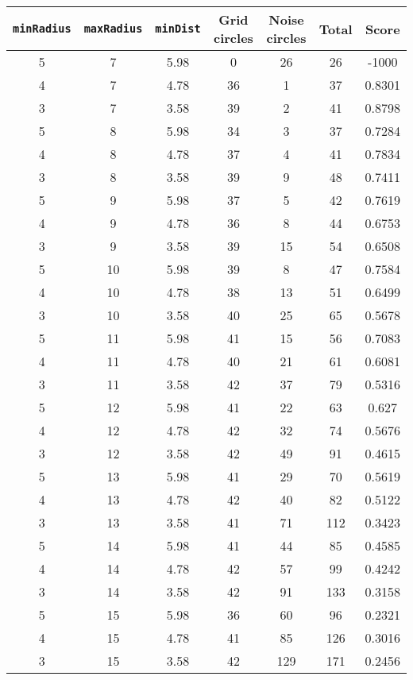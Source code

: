 \documentclass[letterpaper, 12pt]{article}
\begin{document}
\begin{longtable}{|c|c|c|c|c|c|c|}
\hline
\textbf{\texttt{minRadius}} & \textbf{\texttt{maxRadius}} & \textbf{\texttt{minDist}} & \textbf{Grid circles} & \textbf{Noise circles} & \textbf{Total} & \textbf{Score} \\
\hline
5 & 7 & 5.98 & 0 & 26 & 26 & -1000 \\
\hline
4 & 7 & 4.78 & 36 & 1 & 37 & 0.8301 \\
\hline
3 & 7 & 3.58 & 39 & 2 & 41 & 0.8798 \\
\hline
5 & 8 & 5.98 & 34 & 3 & 37 & 0.7284 \\
\hline
4 & 8 & 4.78 & 37 & 4 & 41 & 0.7834 \\
\hline
3 & 8 & 3.58 & 39 & 9 & 48 & 0.7411 \\
\hline
5 & 9 & 5.98 & 37 & 5 & 42 & 0.7619 \\
\hline
4 & 9 & 4.78 & 36 & 8 & 44 & 0.6753 \\
\hline
3 & 9 & 3.58 & 39 & 15 & 54 & 0.6508 \\
\hline
5 & 10 & 5.98 & 39 & 8 & 47 & 0.7584 \\
\hline
4 & 10 & 4.78 & 38 & 13 & 51 & 0.6499 \\
\hline
3 & 10 & 3.58 & 40 & 25 & 65 & 0.5678 \\
\hline
5 & 11 & 5.98 & 41 & 15 & 56 & 0.7083 \\
\hline
4 & 11 & 4.78 & 40 & 21 & 61 & 0.6081 \\
\hline
3 & 11 & 3.58 & 42 & 37 & 79 & 0.5316 \\
\hline
5 & 12 & 5.98 & 41 & 22 & 63 & 0.627 \\
\hline
4 & 12 & 4.78 & 42 & 32 & 74 & 0.5676 \\
\hline
3 & 12 & 3.58 & 42 & 49 & 91 & 0.4615 \\
\hline
5 & 13 & 5.98 & 41 & 29 & 70 & 0.5619 \\
\hline
4 & 13 & 4.78 & 42 & 40 & 82 & 0.5122 \\
\hline
3 & 13 & 3.58 & 41 & 71 & 112 & 0.3423 \\
\hline
5 & 14 & 5.98 & 41 & 44 & 85 & 0.4585 \\
\hline
4 & 14 & 4.78 & 42 & 57 & 99 & 0.4242 \\
\hline
3 & 14 & 3.58 & 42 & 91 & 133 & 0.3158 \\
\hline
5 & 15 & 5.98 & 36 & 60 & 96 & 0.2321 \\
\hline
4 & 15 & 4.78 & 41 & 85 & 126 & 0.3016 \\
\hline
3 & 15 & 3.58 & 42 & 129 & 171 & 0.2456 \\

\end{longtable}
\end{document}

